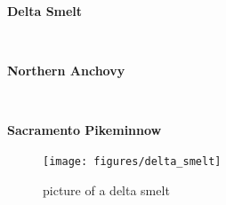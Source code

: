 \documentclass[
]{book}
\begin{document}
\begin{panel-grid}

\begin{columns-nocenter}

\begin{column800}

\textbf{Delta Smelt}

\end{column800}

\begin{column40}

~

\end{column40}

\begin{column800}

\textbf{Northern Anchovy}

\end{column800}

\begin{column40}

~

\end{column40}

\begin{column800}

\textbf{Sacramento Pikeminnow}

\end{column800}

\end{columns-nocenter}

\begin{columns-nocenter}

\begin{column800}

\begin{figure}

{\centering \texttt{[image: figures/delta\_smelt]} 

}

\caption{picture of a delta smelt}\label{fig:unnamed-chunk-76}
\end{figure}

\end{column800}

\begin{column40}

~

\end{column40}

\begin{column800}


\end{column800}
\end{columns-nocenter}
\end{panel-grid}
\end{document}
